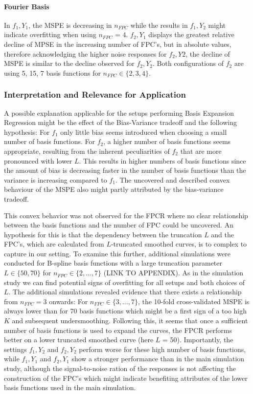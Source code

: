 \documentclass[11pt,twoside,a4paper]{article}
\begin{document}
	\paragraph{Fourier Basis}
	In $f_1,Y_1$, the MSPE is decreasing in $n_{FPC}$ while the results in $f_1,Y_2$ might indicate overfitting when using $n_{FPC}$ = 4. $f_2,Y_1$ displays the greatest relative decline of MPSE in the increasing number of FPC's, but in absolute values, therefore acknowledging the higher noise responses for $f_2,Y2$, the decline of MSPE is similar to the decline observed for $f_2,Y_2$. Both configurations of $f_2$ are using 5, 15, 7 basis functions for $n_{FPC} \in \{2, 3, 4 \}$.
	\vspace{-0.2cm}	
	
	\subsubsection{Interpretation and Relevance for Application}
	A possible explanation applicable for the setups performing Basis Expansion Regression might be the effect of the Bias-Variance tradeoff and the following hypothesis: For $f_1$ only little bias seems introduced when choosing a small number of basis functions. For $f_2$, a higher number of basis functions seems appropriate, resulting from the inherent peculiarities of $f_2$ that are more pronounced with lower $L$. This results in higher numbers of basis functions since the amount of bias is decreasing faster in the number of basis functions than the variance is increasing compared to $f_1$. The uncovered and described convex behaviour of the MSPE also might partly attributed by the bias-variance tradeoff. 
	
	This convex behavior was not observed for the FPCR where no clear relationship between the basis functions and the number of FPC could be uncovered. An hypothesis for this is that the dependency between the truncation $L$ and the FPC's, which are calculated from $L$-truncated smoothed curves, is to complex to capture in our setting. To examine this further, additional simulations were conducted for B-spline basis functions with a large truncation parameter $L \in \{50, 70\}$ for $n_{FPC} \in \{2, \dots, 7 \}$ (LINK TO APPENDIX). As in the simulation study we can find potential signs of overfitting for all setups and both choices of $L$. The additional simulations revealed evidence that there exists a relationship from $n_{FPC} = 3$ onwards: For $n_{FPC} \in \{3, \dots, 7 \}$, the 10-fold cross-validated MSPE is always lower than for 70 basis functions which might be a first sign of a too high $K$ and subsequent undersmoothing. Following this, it seems that once a sufficient number of basis functions is used to expand the curves, the FPCR performs better on a lower truncated smoothed curve (here $L$ = 50). Importantly, the settings $f_1,Y_2$ and $f_2,Y_2$ perform worse for these high number of basis functions, while $f_1,Y_1$ and $f_2,Y_1$ show a stronger performance than in the main simulation study, although the signal-to-noise ration of the responses is not affecting the construction of the FPC's which might indicate benefiting attributes of the lower basis functions used in the main simulation.
	
\end{document}
